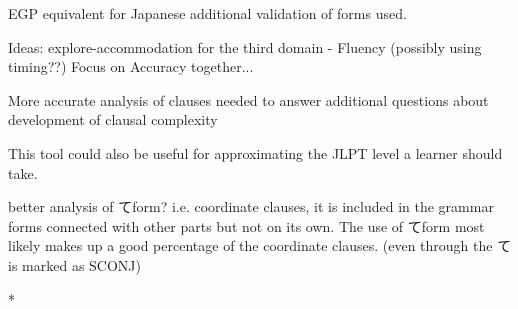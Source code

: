 



EGP equivalent for Japanese additional validation of forms used.

Ideas: explore-accommodation for the third domain - Fluency (possibly using timing??)  Focus on Accuracy together...

More accurate analysis of clauses needed to answer additional questions about development of clausal complexity

This tool could also be useful for approximating the JLPT level a learner should take.

better analysis of てform? i.e. coordinate clauses, it is included in the grammar forms connected with other parts
but not on its own. The use of てform most likely makes up a good percentage of the coordinate clauses. (even through
the て is marked as SCONJ)


*